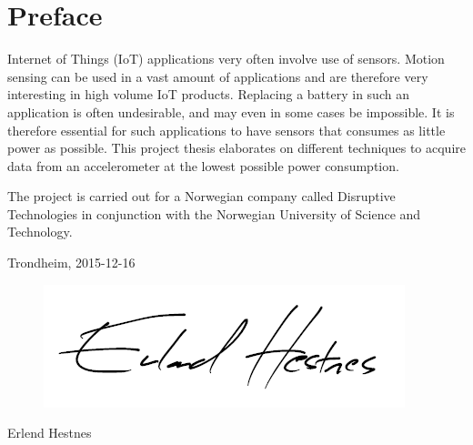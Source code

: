 \section*{Preface}

Internet of Things (IoT) applications very often involve use of sensors. Motion sensing can be used in a vast amount of applications and are therefore very interesting in high volume IoT products. Replacing a battery in such an application is often undesirable, and may even in some cases be impossible. It is therefore essential for such applications to have sensors that consumes as little power as possible. This project thesis elaborates on different techniques to acquire data from an accelerometer at the lowest possible power consumption. 

The project is carried out for a Norwegian company called Disruptive Technologies in conjunction with the Norwegian University of Science and Technology.


\begin{center}
Trondheim, 2015-12-16\\[1pc]
\begin{figure}[h]
\centering
\includegraphics[scale=0.5]{fig/underskrift.png}
\label{fig:underskrift}
\end{figure}
Erlend Hestnes
\end{center}